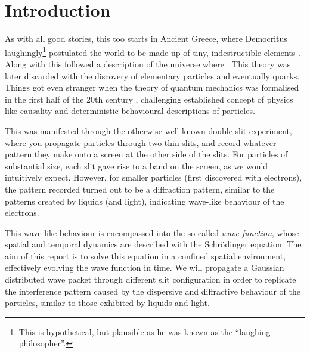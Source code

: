 \section{Introduction}\label{sec:introduction}

As with all good stories, this too starts in Ancient Greece, where Democritus laughingly\footnote{This is hypothetical, but plausible as he was known as the ``laughing philosopher''.} postulated the world to be made up of tiny, indestructible elements \citep{berryman_2016}. Along with this followed a description of the universe where . This theory was later discarded with the discovery of elementary particles and eventually quarks. Things got even stranger when the theory of quantum mechanics was formalised in the first half of the 20th century \citep{QMH}, challenging established concept of physics like causality and deterministic behavioural descriptions of particles. 

This was manifested through the otherwise well known double slit experiment, where you propagate particles through two thin slits, and record whatever pattern they make onto a screen at the other side of the slits. For particles of substantial size, each slit gave rise to a band on the screen, as we would intuitively expect. However, for smaller particles (first discovered with electrons), the pattern recorded turned out to be a diffraction pattern, similar to the patterns created by liquids (and light), indicating wave-like behaviour of the electrons. 

This wave-like behaviour is encompassed into the so-called \textit{wave function}, whose spatial and temporal dynamics are described with the Schrödinger equation. The aim of this report is to solve this equation in a confined spatial environment, effectively evolving the wave function in time. We will propagate a Gaussian distributed wave packet through different slit configuration in order to replicate the interference pattern caused by the dispersive and diffractive behaviour of the particles, similar to those exhibited by liquids and light.

